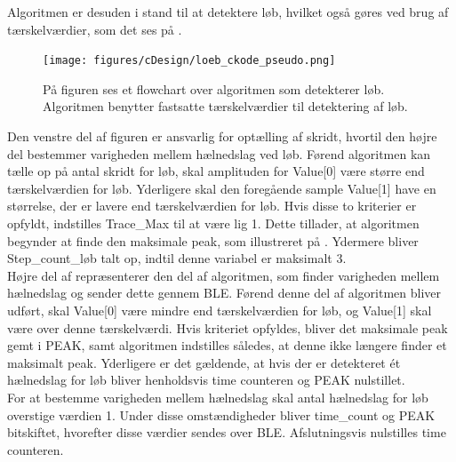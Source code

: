 Algoritmen er desuden i stand til at detektere løb, hvilket også gøres ved brug af tærskelværdier, som det ses på .
\begin{figure}[H]
	\centering
	\texttt{[image: figures/cDesign/loeb\_ckode\_pseudo.png]}
	\caption{På figuren ses et flowchart over algoritmen som detekterer løb. Algoritmen benytter fastsatte tærskelværdier til detektering af løb.}
	\label{fig:loeb_pseudo}
\end{figure} \vspace{-0.5cm}
Den venstre del af figuren er ansvarlig for optælling af skridt, hvortil den højre del bestemmer varigheden mellem hælnedslag ved løb. Førend algoritmen kan tælle op på antal skridt for løb, skal amplituden for Value[0] være større end tærskelværdien for løb. Yderligere skal den foregående sample Value[1] have en størrelse, der er lavere end tærskelværdien for løb. Hvis disse to kriterier er opfyldt, indstilles Trace\_Max til at være lig 1. Dette tillader, at algoritmen begynder at finde den maksimale peak, som illustreret på . Ydermere bliver Step\_count\_løb talt op, indtil denne variabel er maksimalt 3. \\
Højre del af  repræsenterer den del af algoritmen, som finder varigheden mellem hælnedslag og sender dette gennem BLE. Førend denne del af algoritmen bliver udført, skal Value[0] være mindre end tærskelværdien for løb, og Value[1] skal være over denne tærskelværdi. Hvis kriteriet opfyldes, bliver det maksimale peak gemt i PEAK, samt algoritmen indstilles således, at denne ikke længere finder et maksimalt peak. Yderligere er det gældende, at hvis der er detekteret ét hælnedslag for løb bliver henholdsvis time counteren og PEAK nulstillet. \\
For at bestemme varigheden mellem hælnedslag  skal antal hælnedslag for løb overstige værdien 1. Under disse omstændigheder bliver time\_count og PEAK bitskiftet, hvorefter disse værdier sendes over BLE. Afslutningsvis nulstilles time counteren.

